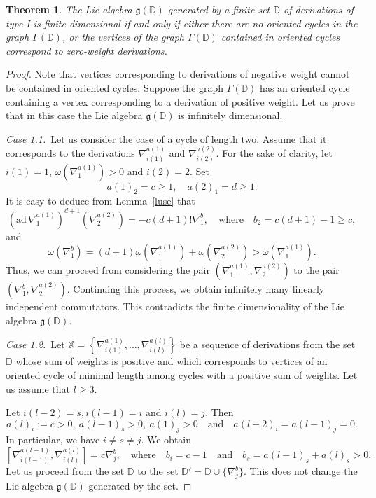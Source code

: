 \documentclass[a4paper, 12pt,oneside,reqno]{amsart}
\numberwithin{equation}{section}
\newtheorem{theorem}{Theorem}[section]
\theoremstyle{definition}
\begin{document}
\begin{theorem}
\label{t1}
The Lie algebra $\mathfrak{g}(\mathbb{D})$ generated by a finite set $\mathbb{D}$ of derivations of type I is finite-dimensional if and only if either there are no oriented cycles in the graph $\Gamma(\mathbb{D})$, or the vertices of the graph $\Gamma(\mathbb{D})$ contained in oriented cycles correspond to zero-weight derivations.
\end{theorem}

\begin{proof}
Note that vertices corresponding to derivations of negative weight cannot be contained in oriented cycles. Suppose the graph $\Gamma(\mathbb{D})$ has an oriented cycle containing a vertex corresponding to a derivation of positive weight. Let us prove that in this case the Lie algebra $\mathfrak{g}(\mathbb{D})$ is infinitely dimensional.


{\it Case 1.1.}\ Let us consider the case of a cycle of length two. Assume that it corresponds to the derivations $\nabla^{a(1)}_{i(1)}$ and $\nabla^{a(2)}_{i(2)}$. For the sake of clarity, let $i(1)=1$, $\omega(\nabla^{a(1)}_1)>0$ and $i(2)=2$. Set $$
a(1)_2=c\ge 1, \quad a(2)_1=d\ge 1. 
$$
It is easy to deduce from Lemma~\ref{luse} that
$$
(\mathrm{ad}\,\nabla^{a(1)}_1)^{d+1}(\nabla^{a(2)}_2)=-c(d+1)!\nabla^b_1, \quad \text{where}\quad b_2=c(d+1)-1\ge c,
$$
and
$$
\omega(\nabla^b_1)=(d+1)\omega(\nabla^{a(1)}_1)+\omega(\nabla^{a(2)}_2)>\omega(\nabla^ {a(1)}_1).
$$
Thus, we can proceed from considering the pair $\left(\nabla^{a(1)}_1, \nabla^{a(2)}_2\right)$ to the pair $\left(\nabla^b_1, \nabla^{a(2)}_2\right)$. Continuing this process, we obtain infinitely many linearly independent commutators. This contradicts the finite dimensionality of the Lie algebra $\mathfrak{g}(\mathbb{D})$.

\smallskip

{\it Case 1.2.}\ Let $\mathbb{X}=\left\{\nabla^{a(1)}_{i(1)},\ldots,\nabla^{a(l)}_ {i(l)}\right\}$ be a sequence of derivations from the set $\mathbb{D}$ whose sum of weights is positive and which corresponds to vertices of an oriented cycle of minimal length among cycles with a positive sum of weights. Let us assume that $l\ge 3$.

Let $i(l-2)=s, i(l-1)=i$ and $i(l)=j$. Then
$$
a(l)_i:=c>0, \ a(l-1)_s>0, \ a(1)_j>0 \quad \text{and} \quad a(l-2)_i=a(l -1)_j=0.
$$
In particular, we have $i\ne s\ne j$. We obtain
$$
\left[\nabla^{a(l-1)}_{i(l-1)},\nabla^{a(l)}_{i(l)}\right]=c\nabla^b_j, \quad \text{where} \quad b_i=c-1 \quad \text{and} \quad b_s=a(l-1)_s+a(l)_s>0.
$$
Let us proceed from the set $\mathbb{D}$ to the set $\mathbb{D}'=\mathbb{D}\cup\{\nabla^b_j\}$. This does not change the Lie algebra $\mathfrak{g}(\mathbb{D})$ generated by the set.


\end{proof}
\end{document}
